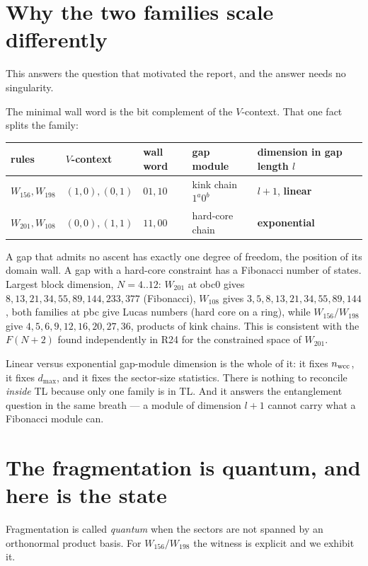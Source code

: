 \documentclass[11pt]{article}
\theoremstyle{plain}
\theoremstyle{remark}
\begin{document}
\section{Why the two families scale differently}
\label{sec:scaling}

This answers the question that motivated the report, and the answer needs no
singularity.

The minimal wall word is the bit complement of the $V$-context. That one fact
splits the family:
\begin{center}
\begin{tabular}{lllll}
\toprule
rules & $V$-context & wall word & gap module & dimension in gap length $l$ \\
\midrule
$W_{156}, W_{198}$ & $(1,0),(0,1)$ & $01, 10$ & kink chain $1^a0^b$ & $l+1$, \textbf{linear} \\
$W_{201}, W_{108}$ & $(0,0),(1,1)$ & $11, 00$ & hard-core chain & \textbf{exponential} \\
\bottomrule
\end{tabular}
\end{center}

\noindent A gap that admits no ascent has exactly one degree of freedom, the
position of its domain wall. A gap with a hard-core constraint has a Fibonacci
number of states. Largest block dimension, $N = 4..12$: $W_{201}$ at obc0 gives
$8, 13, 21, 34, 55, 89, 144, 233, 377$ (Fibonacci), $W_{108}$ gives
$3,5,8,13,21,34,55,89,144$, both families at pbc give Lucas numbers (hard core on
a ring), while $W_{156}/W_{198}$ give $4,5,6,9,12,16,20,27,36$, products of kink
chains. This is consistent with the $F(N+2)$ found independently in R24 for the
constrained space of $W_{201}$.

Linear versus exponential gap-module dimension is the whole of it: it fixes
$n_{\rm wcc}$, it fixes $d_{\max}$, and it fixes the sector-size statistics.
There is nothing to reconcile \emph{inside} TL because only one family is in TL.
And it answers the entanglement question in the same breath --- a module of
dimension $l+1$ cannot carry what a Fibonacci module can.

\section{The fragmentation is quantum, and here is the state}
\label{sec:quantum}

Fragmentation is called \emph{quantum} when the sectors are not spanned by an
orthonormal product basis. For $W_{156}/W_{198}$ the witness is explicit and we
exhibit it.
\end{document}
